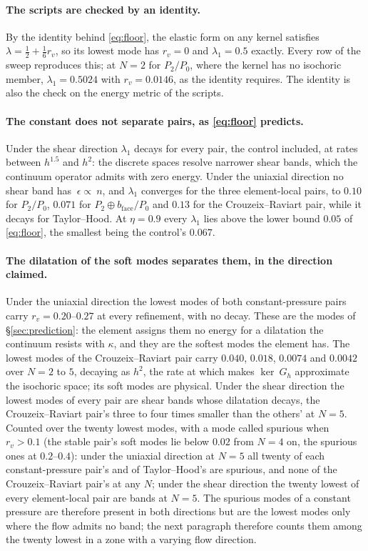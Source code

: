 \documentclass[11pt]{article}
\newcommand{\eps}{~\epsilon}
\theoremstyle{definition}
\theoremstyle{plain}
\begin{document}
\paragraph{The scripts are checked by an identity.} By the identity behind
\eqref{eq:floor}, the elastic form on any kernel satisfies
$\lambda = \tfrac12 + \tfrac16 r_v$, so its lowest mode has $r_v = 0$ and
$\lambda_1 = 0.5$ exactly. Every row of the sweep reproduces this; at $N = 2$
for $P_2/P_0$, where the kernel has no isochoric member, $\lambda_1 = 0.5024$
with $r_v = 0.0146$, as the identity requires. The identity is also the check
on the energy metric of the scripts.

\paragraph{The constant does not separate pairs, as \eqref{eq:floor}
predicts.} Under the shear direction $\lambda_1$ decays for every pair, the
control included, at rates between $h^{1.5}$ and $h^2$: the discrete spaces
resolve narrower shear bands, which the continuum operator admits with zero energy.
Under the uniaxial direction no shear band has $\eps \propto ~n$, and
$\lambda_1$ converges for the three element-local pairs, to $0.10$ for
$P_2/P_0$, $0.071$ for $P_2 \oplus b_{\mathrm{face}}/P_0$ and $0.13$ for the
Crouzeix--Raviart pair, while it decays for Taylor--Hood. At $\eta = 0.9$
every $\lambda_1$ lies above the lower bound $0.05$ of \eqref{eq:floor}, the smallest being the
control's $0.067$.

\paragraph{The dilatation of the soft modes separates them, in the direction
claimed.} Under the uniaxial direction the lowest modes of both
constant-pressure pairs carry $r_v = 0.20$--$0.27$ at every refinement, with
no decay. These are the modes of \S\ref{sec:prediction}: the element assigns
them no energy for a dilatation the continuum resists with $\kappa$, and they
are the softest modes the element has. The lowest modes of the
Crouzeix--Raviart pair carry $0.040$, $0.018$, $0.0074$ and $0.0042$ over
$N = 2$ to $5$, decaying as $h^2$, the rate at which
\citet[Prop.~5.1.3]{BoffiBrezziFortin:2013} makes $\ker ~G_h$ approximate the
isochoric space; its soft modes are physical. Under the shear direction the
lowest modes of every pair are shear bands whose dilatation decays, the
Crouzeix--Raviart pair's three to four times smaller than the others' at
$N = 5$. Counted over the twenty lowest modes, with a mode called spurious when
$r_v > 0.1$ (the stable pair's soft modes lie below $0.02$ from $N = 4$ on,
the spurious ones at $0.2$--$0.4$): under the uniaxial direction at $N = 5$
all twenty of each constant-pressure pair's and of Taylor--Hood's are
spurious, and none of the Crouzeix--Raviart pair's at any $N$; under the
shear direction the twenty lowest of every element-local pair are bands at
$N = 5$. The spurious modes of a constant pressure are therefore present in
both directions but are the lowest modes only where the flow admits no band;
the next paragraph therefore counts them among the twenty lowest in a zone
with a varying flow direction.
\end{document}
